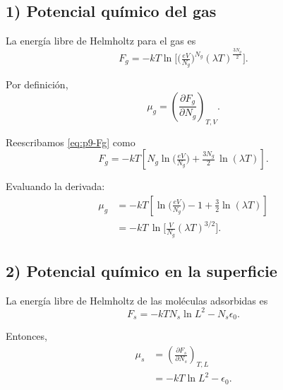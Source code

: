 \documentclass{article}
\begin{document}
\subsection*{1) Potencial químico del gas}

La energía libre de Helmholtz para el gas es
\begin{equation}
F_g = -kT \ln \Bigg[ \Big(\tfrac{eV}{N_g}\Big)^{N_g} (\lambda T)^{\tfrac{3N_g}{2}} \Bigg].
\label{eq:p9-Fg}
\end{equation}

Por definición,
\begin{equation}
\mu_g = \left(\frac{\partial F_g}{\partial N_g}\right)_{T,V}.
\label{eq:p9-mu-def}
\end{equation}

Reescribamos \eqref{eq:p9-Fg} como
\begin{equation}
F_g = -kT \left[ N_g \ln \Big(\tfrac{eV}{N_g}\Big) + \tfrac{3N_g}{2}\,\ln (\lambda T) \right].
\label{eq:p9-Fg-expanded}
\end{equation}

Evaluando la derivada:
\begin{equation}
\begin{split}
\mu_g
&= -kT \left[ \ln\!\Big(\tfrac{eV}{N_g}\Big) - 1 + \tfrac{3}{2}\ln (\lambda T) \right] \\[6pt]
&= -kT \,\ln \Bigg[ \frac{V}{N_g} (\lambda T)^{3/2} \Bigg].
\end{split}
\label{eq:p9-mug}
\end{equation}

\subsection*{2) Potencial químico en la superficie}

La energía libre de Helmholtz de las moléculas adsorbidas es
\begin{equation}
F_s = -kT N_s \ln L^2 - N_s \epsilon_0.
\label{eq:p9-Fs}
\end{equation}

Entonces,
\begin{equation}
\begin{split}
\mu_s
&= \left(\frac{\partial F_s}{\partial N_s}\right)_{T,L} \\[6pt]
&= -kT \ln L^2 - \epsilon_0.
\end{split}
\label{eq:p9-mus}
\end{equation}
\end{document}
